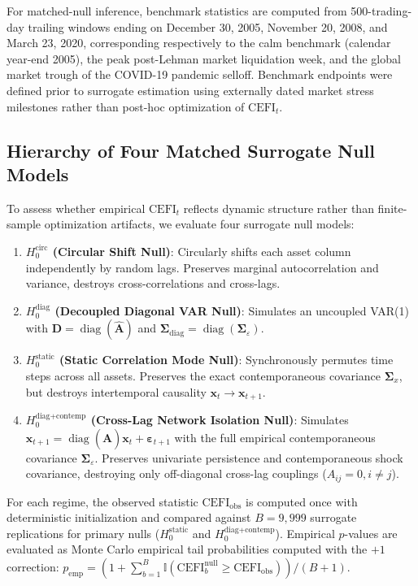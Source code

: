 \documentclass[review,12pt,authoryear]{elsarticle}
\begin{document}
For matched-null inference, benchmark statistics are computed from 500-trading-day trailing windows ending on December 30, 2005, November 20, 2008, and March 23, 2020, corresponding respectively to the calm benchmark (calendar year-end 2005), the peak post-Lehman market liquidation week, and the global market trough of the COVID-19 pandemic selloff. Benchmark endpoints were defined prior to surrogate estimation using externally dated market stress milestones rather than post-hoc optimization of $\mathrm{CEFI}_t$.

\subsection{Hierarchy of Four Matched Surrogate Null Models}
To assess whether empirical $\mathrm{CEFI}_t$ reflects dynamic structure rather than finite-sample optimization artifacts, we evaluate four surrogate null models:
\begin{enumerate}
    \item \textbf{$H_0^{\text{circ}}$ (Circular Shift Null)}: Circularly shifts each asset column independently by random lags. Preserves marginal autocorrelation and variance, destroys cross-correlations and cross-lags.
    \item \textbf{$H_0^{\text{diag}}$ (Decoupled Diagonal VAR Null)}: Simulates an uncoupled VAR(1) with $\mathbf{D} = \operatorname{diag}(\hat{\mathbf{A}})$ and $\boldsymbol{\Sigma}_{\text{diag}} = \operatorname{diag}(\boldsymbol{\Sigma}_\varepsilon)$.
    \item \textbf{$H_0^{\text{static}}$ (Static Correlation Mode Null)}: Synchronously permutes time steps across all assets. Preserves the exact contemporaneous covariance $\boldsymbol{\Sigma}_x$, but destroys intertemporal causality $\mathbf{x}_t \to \mathbf{x}_{t+1}$.
    \item \textbf{$H_0^{\text{diag+contemp}}$ (Cross-Lag Network Isolation Null)}: Simulates $\mathbf{x}_{t+1} = \operatorname{diag}(\hat{\mathbf{A}})\mathbf{x}_t + \boldsymbol{\varepsilon}_{t+1}$ with the full empirical contemporaneous covariance $\boldsymbol{\Sigma}_\varepsilon$. Preserves univariate persistence and contemporaneous shock covariance, destroying only off-diagonal cross-lag couplings ($A_{ij} = 0, i \neq j$).
\end{enumerate}
For each regime, the observed statistic $\mathrm{CEFI}_{\text{obs}}$ is computed once with deterministic initialization and compared against $B=9,999$ surrogate replications for primary nulls ($H_0^{\text{static}}$ and $H_0^{\text{diag+contemp}}$). Empirical $p$-values are evaluated as Monte Carlo empirical tail probabilities computed with the $+1$ correction: $p_{\text{emp}} = (1 + \sum_{b=1}^B \mathbb{I}(\mathrm{CEFI}_b^{\text{null}} \ge \mathrm{CEFI}_{\text{obs}}))/(B + 1)$.
\end{document}
